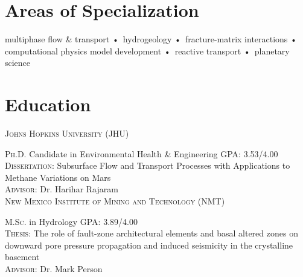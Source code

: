 \documentclass[11pt, letterpaper]{article}
\newcommand{\years}[1]{\marginnote{\scriptsize #1}}
\begin{document}

\section*{Areas of Specialization}
\begin{center}
    multiphase flow \& transport •\ hydrogeology •\ fracture-matrix interactions •\ \\
    computational physics model development •\ reactive transport •\ planetary science %
\end{center}

\section*{Education}
\noindent
\newlength\q
\setlength{}

\years{2024}\textsc{Johns Hopkins University (JHU)}

    \noindent
    \textsc{Ph.D.} Candidate in Environmental Health \& Engineering \hfill GPA: 3.53/4.00\\
    \textsc{Dissertation:} Subsurface Flow and Transport Processes with
    Applications to Methane Variations on Mars\\
    \textsc{Advisor:} Dr. Harihar Rajaram \\

\years{2017}\textsc{New Mexico Institute of Mining and Technology (NMT)}

    \textsc{M.Sc.} in Hydrology \hfill GPA: 3.89/4.00\\
	\textsc{Thesis:} The role of fault-zone architectural elements and basal
	altered zones on downward pore pressure propagation and induced seismicity
	in the crystalline basement\\
    \textsc{Advisor:} Dr. Mark Person\\
\end{document}

